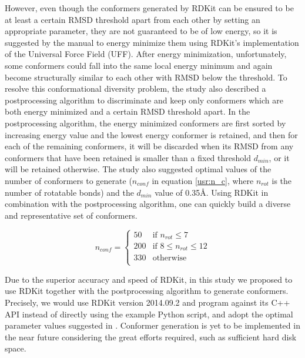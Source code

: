 However, even though the conformers generated by RDKit can be ensured to be at least a certain RMSD threshold apart from each other by setting an appropriate parameter, they are not guaranteed to be of low energy, so it is suggested by the manual to energy minimize them using RDKit's implementation of the Universal Force Field (UFF). After energy minimization, unfortunately, some conformers could fall into the same local energy minimum and again become structurally similar to each other with RMSD below the threshold. To resolve this conformational diversity problem, the study \citep{1127} also described a postprocessing algorithm to discriminate and keep only conformers which are both energy minimized and a certain RMSD threshold apart. In the postprocessing algorithm, the energy minimized conformers are first sorted by increasing energy value and the lowest energy conformer is retained, and then for each of the remaining conformers, it will be discarded when its RMSD from any conformers that have been retained is smaller than a fixed threshold $d_{min}$, or it will be retained otherwise. The study \citep{1127} also suggested optimal values of the number of conformers to generate ($n_{conf}$ in equation \eqref{usr:n_c}, where $n_{rot}$ is the number of rotatable bonds) and the $d_{min}$ value of 0.35\AA. Using RDKit in combination with the postprocessing algorithm, one can quickly build a diverse and representative set of conformers.

\begin{equation}
n_{conf}=
\begin{cases}
 50 & \text{if } n_{rot} \leq 7\\
200 & \text{if } 8 \leq n_{rot} \leq 12\\
330 & \text{otherwise}\\
\end{cases}
\label{usr:n_c}
\end{equation}

Due to the superior accuracy and speed of RDKit, in this study we proposed to use RDKit together with the postprocessing algorithm to generate conformers. Precisely, we would use RDKit version 2014.09.2 and program against its C++ API instead of directly using the example Python script, and adopt the optimal parameter values suggested in \citep{1127}. Conformer generation is yet to be implemented in the near future considering the great efforts required, such as sufficient hard disk space.%

